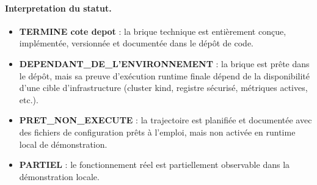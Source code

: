 \paragraph{Interpretation du statut.}
\begin{itemize}
  \item \textbf{TERMINE cote depot} : la brique technique est entièrement conçue, implémentée, versionnée et documentée dans le dépôt de code.
  \item \textbf{DEPENDANT\_DE\_L'ENVIRONNEMENT} : la brique est prête dans le dépôt, mais sa preuve d'exécution runtime finale dépend de la disponibilité d'une cible d'infrastructure (cluster kind, registre sécurisé, métriques actives, etc.).
  \item \textbf{PRET\_NON\_EXECUTE} : la trajectoire est planifiée et documentée avec des fichiers de configuration prêts à l'emploi, mais non activée en runtime local de démonstration.
  \item \textbf{PARTIEL} : le fonctionnement réel est partiellement observable dans la démonstration locale.
\end{itemize}
